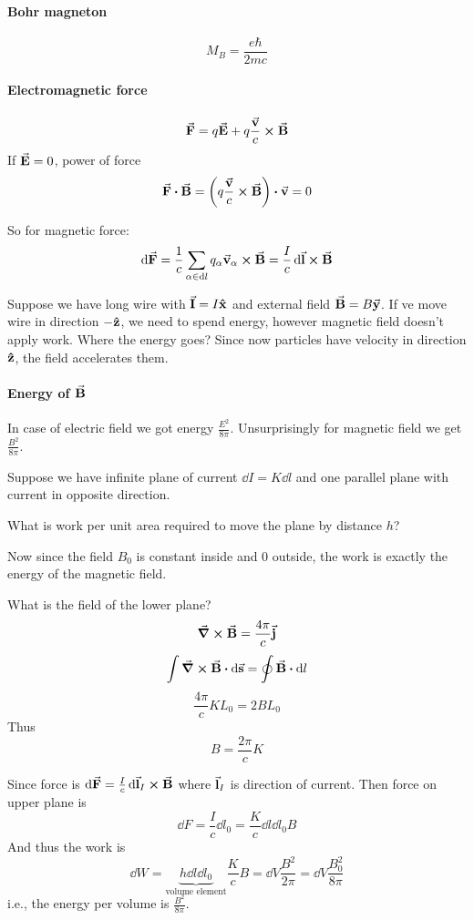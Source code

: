 \paragraph{Bohr magneton} $$M_B = \frac{e\hbar}{2mc}$$
\paragraph{Electromagnetic force}
$$\va{F} = q\va{E}  + q\frac{\va{v}}{c}\cross \va{B}$$
If $\va{E} = 0$, power of force
$$\va{F} \vdot \va{B} = \qty(q\frac{\va{v}}{c}\cross \va{B}) \vdot \va{v}= 0$$

So for magnetic force:
$$\dd{\va{F}} = \frac{1}{c} \sum_{\alpha \in \dd{l}} q_\alpha \va{v}_\alpha \cross \va{B} = \frac{I}{c} \dd{\va{l}} \cross \va{B}$$

Suppose we have long wire with $\va{I} = I\vu{x}$ and external field $\va{B} = B\va{y}$. If ve move wire in direction $-\vu{z}$, we need to spend energy, however magnetic field doesn't apply work. Where the energy goes? Since now particles have velocity in direction $\vu{z}$, the field accelerates them.

\paragraph{Energy of $\va{B}$}
In case of electric field we got energy $\frac{E^2}{8\pi}$. Unsurprisingly for magnetic field we get $\frac{B^2}{8\pi}$.

Suppose we have infinite plane of current $\dd{I} = K \dd{l}$ and one parallel plane with current in opposite direction.

What is work per unit area required to move the plane by distance $h$?

Now since the field $B_0$ is constant inside and 0 outside, the work is exactly the energy of the magnetic field.

What is the field of the lower plane?
$$\curl{\va{B}} = \frac{4\pi}{c} \va{j}$$
$$\int \curl{\va{B}} \vdot \dd{\va{s}} = \oint \va{B} \vdot \dd{l}$$
$$\frac{4\pi}{c} KL_0 = 2BL_0$$
Thus
$$B = \frac{2\pi}{c} K$$

Since force is $\dd{\va{F}} =\frac{I}{c} \dd{\va{l}_I} \cross \va{B}$
where $\va{l}_I$ is direction of current. Then force on upper plane is
$$\dd{F} = \frac{I}{c}\dd{l_0}  = \frac{K}{c}\dd{l}\dd{l_0} B $$
And thus the work is
$$\dd{W} = \underbrace{h\dd{l}\dd{l_0}}_{\text{volume element}} \frac{K}{c}B = \dd{V} \frac{B^2}{2\pi} =  \dd{V} \frac{B^2_0}{8\pi}  $$
i.e., the energy per volume is $\frac{B^2}{8\pi}$.

